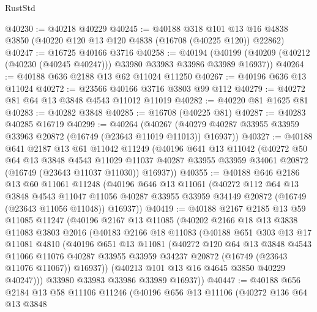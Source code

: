 \begin{lexlean}{RustStd}
\begin{coremodule}
@40230 := @40218 @40229
@40245 := @40188
    @318
    @101
    @13
    @16
    @4838
    @3850
    (@40220 @120 @13 @120 @4838 (@16708 (@40225 @120)) @22862)
@40247 := @16725 @40166 @3716
@40258 := @40194
    (@40199 (@40209 (@40212 (@40230 (@40245 @40247))) @33980 @33983 @33986 @33989 @16937))
@40264 := @40188 @636 @2188 @13 @62 @11024 @11250
@40267 := @40196 @636 @13 @11024
@40272 := @23566 @40166 @3716 @3803 @99 @112
@40279 := @40272 @81 @64 @13 @3848 @4543 @11012 @11019
@40282 := @40220 @81 @1625 @81
@40283 := @40282 @3848
@40285 := @16708 (@40225 @81)
@40287 := @40283 @40285 @16719
@40299 := @40264
    (@40267 (@40279 @40287 @33955 @33959 @33963 @20872 (@16749 (@23643 @11019 @11013)) @16937))
@40327 := @40188
    @641
    @2187
    @13
    @61
    @11042
    @11249
    (@40196
      @641
      @13
      @11042
      (@40272
        @50
        @64
        @13
        @3848
        @4543
        @11029
        @11037
        @40287
        @33955
        @33959
        @34061
        @20872
        (@16749 (@23643 @11037 @11030))
        @16937))
@40355 := @40188
    @646
    @2186
    @13
    @60
    @11061
    @11248
    (@40196
      @646
      @13
      @11061
      (@40272
        @112
        @64
        @13
        @3848
        @4543
        @11047
        @11056
        @40287
        @33955
        @33959
        @34149
        @20872
        (@16749 (@23643 @11056 @11048))
        @16937))
@40419 := @40188
    @2167
    @2185
    @13
    @59
    @11085
    @11247
    (@40196
      @2167
      @13
      @11085
      (@40202
        @2166
        @18
        @13
        @3838
        @11083
        @3803
        @2016
        (@40183
          @2166
          @18
          @11083
          (@40188
            @651
            @303
            @13
            @17
            @11081
            @4810
            (@40196
              @651
              @13
              @11081
              (@40272
                @120
                @64
                @13
                @3848
                @4543
                @11066
                @11076
                @40287
                @33955
                @33959
                @34237
                @20872
                (@16749 (@23643 @11076 @11067))
                @16937))
            (@40213 @101 @13 @16 @4645 @3850 @40229 @40247)))
        @33980
        @33983
        @33986
        @33989
        @16937))
@40447 := @40188
    @656
    @2184
    @13
    @58
    @11106
    @11246
    (@40196
      @656
      @13
      @11106
      (@40272
        @136
        @64
        @13
        @3848

\end{coremodule}
\end{lexlean}
